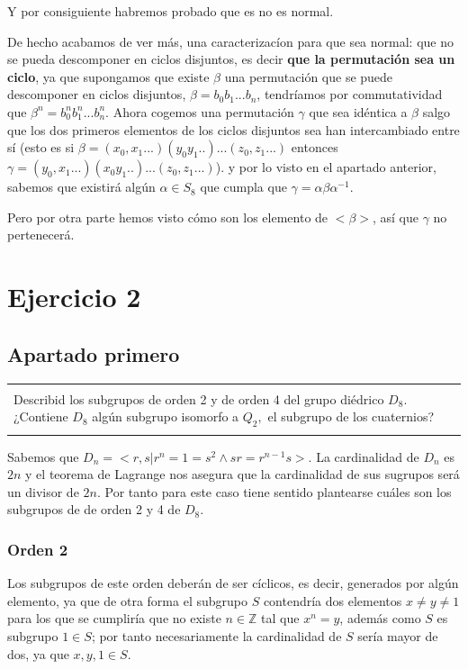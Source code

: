 \documentclass[12pt]{article}
\newenvironment{micaja}
{
    \begin{center}
    \begin{tabular}{|p{0.9\textwidth}|}
    \hline\\
    }   
    {   
    \\\\\hline
    \end{tabular} 
    \end{center}
    }
\begin{document}
Y por consiguiente habremos probado que es no es normal. 


 De hecho acabamos de ver más, una caracterizacíon para que sea normal: 
que no se pueda descomponer en ciclos disjuntos, es decir \textbf{que la permutación sea un ciclo}, 
ya que supongamos que existe $\beta$ una permutación que se puede descomponer en ciclos disjuntos, 
$\beta = b_0 b_1...b_n$, tendríamos por commutatividad que 
$\beta ^n = b_0^n b_1^n...b_n^n$. Ahora cogemos una permutación $\gamma$ que sea idéntica a $\beta$ salgo que los dos primeros elementos
de los ciclos disjuntos sea han intercambiado entre sí (esto es si $\beta = (x_0,x_1...)(y_0 y_1..)...(z_0,z_1...)$ entonces $\gamma =(y_0,x_1...)(x_0 y_1..)...(z_0,z_1...)$). 
y por lo visto en el apartado anterior, sabemos que existirá algún $\alpha \in S_8$ que cumpla que $\gamma = \alpha \beta \alpha^{-1}.$

Pero por otra parte hemos visto cómo son los elemento de $<\beta>$, así que $\gamma$ no pertenecerá. 


\newpage

\section{Ejercicio 2}

\subsection{Apartado primero}

\begin{micaja}
    Describid los subgrupos de orden 2 y de orden 4 del grupo diédrico $D_8.$
    ¿Contiene $D_8$ algún subgrupo isomorfo a $Q_2,$ el subgrupo de los cuaternios?
\end{micaja}

Sabemos que $D_n = <r,s | r^n = 1 = s^2 \wedge sr = r^{n-1}s>.$
La cardinalidad de $D_n$ es $2n$ y el  teorema de Lagrange nos asegura que la cardinalidad de
sus sugrupos será un divisor de $2n.$ Por tanto para este caso tiene sentido plantearse cuáles son los subgrupos de
de orden 2 y 4 de $D_8.$


\subsubsection*{Orden 2}

Los subgrupos de este orden deberán de ser cíclicos, es decir, generados por algún elemento, 
ya que de otra forma el subgrupo $S$ contendría dos elementos $x \neq y \neq 1$ para los que se cumpliría 
que no existe $n \in \mathbb Z$ tal que $x^n = y$, además como $S$ es subgrupo $1 \in S$; por tanto
necesariamente la cardinalidad de $S$ sería mayor de dos, ya que $x,y,1 \in S.$ \paragraph{}
\end{document}
